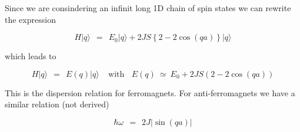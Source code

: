 \documentclass[10pt]{report}
\numberwithin{equation}{chapter}
\begin{document}


Since we are consindering an infinit long 1D chain of spin states we can rewrite the expression

\begin{equation}
  H |q\rangle ~~=~~ E_0 |q\rangle + 2JS \left\{ 2 - 2\cos(qa) \right\} |q\rangle
\end{equation} 

which leads to

\begin{equation}
  H |q\rangle ~~=~~ E(q) |q\rangle ~~~~~ \text{with} ~~~~ E(q) ~≃~ E_0 + 2JS(2 - 2\cos(qa))
\end{equation}

This is the dispersion relation for ferromagnets. For anti-ferromagnets we have a similar relation (not derived)

\begin{equation}
  \hbar \omega ~~=~~ 2J | \sin(qa) |
\end{equation}





\end{document}

